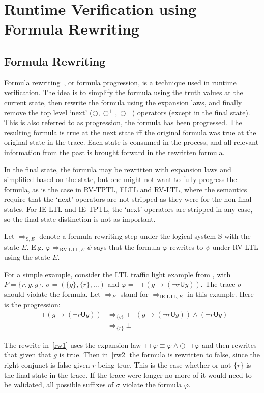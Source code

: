 \documentclass[a4paper]{article}
\newcommand{\U}{\mathsf{U}}
\newcommand{\sn}{\bigcirc^+}
\newcommand{\wn}{\bigcirc^-}
\newcommand{\rw}[1]{\Rightarrow_{#1}}
\begin{document}
\section{Runtime Verification using Formula Rewriting}
\subsection{Formula Rewriting}
Formula rewriting~\autocite{rosu2005rewriting}, or formula progression, is a technique used in runtime verification.
The idea is to simplify the formula using the truth values at the current state, then rewrite the formula using the expansion laws, and finally remove the top level `next' ($\bigcirc,\sn,\wn$) operators (except in the final state). This is also referred to as progression, the formula has been progressed. The resulting formula is true at the next state iff the original formula was true at the original state in the trace.
Each state is consumed in the process, and all relevant information from the past is brought forward in the rewritten formula.

In the final state, the formula may be rewritten with expansion laws and simplified based on the state, but one might not want to fully progress the formula, as is the case in RV-TPTL, FLTL and RV-LTL, where the semantics require that the `next' operators are not stripped as they were for the non-final states. For IE-LTL and IE-TPTL, the `next' operators are stripped in any case, so the final state distinction is not as important.

\begin{notn}[Rewrites]

  Let $\rw{\text{S},E}$ denote a formula rewriting step under the logical system S with the state $E$. E.g. $\varphi\rw{\text{RV-LTL},E}\psi$ says that the formula $\varphi$ rewrites to $\psi$ under RV-LTL using the state $E$.
\end{notn}

\begin{eg}

  For a simple example, consider the LTL traffic light example from \textcite[175]{rosu2005rewriting}, with $P=\{r,y,g\}$, $\sigma = (\{g\},\{r\},\dots)$ and $\varphi = \Box (g \to (\neg r \U y))$. The trace $\sigma$ should violate the formula. Let $\rw{E}$ stand for $\rw{\text{IE-LTL},E}$ in this example. Here is the progression:
\begin{align}
  \Box (g \to (\neg r \U y)) &\rw{\{g\}} \Box (g \to (\neg r \U y)) \land (\neg r \U y)\label{rw1}\\
  &\rw{\{r\}} \bot\label{rw2}
\end{align}

The rewrite in~\eqref{rw1} uses the expansion law $\Box \varphi \equiv \varphi \land \bigcirc \Box \varphi$ and then rewrites that given that $g$ is true.
Then in~\eqref{rw2} the formula is rewritten to false, since the right conjunct is false given $r$ being true. This is the case whether or not $\{r\}$ is the final state in the trace. If the trace were longer no more of it would need to be validated, all possible suffixes of $\sigma$ violate the formula $\varphi$.
\end{eg}
\end{document}
